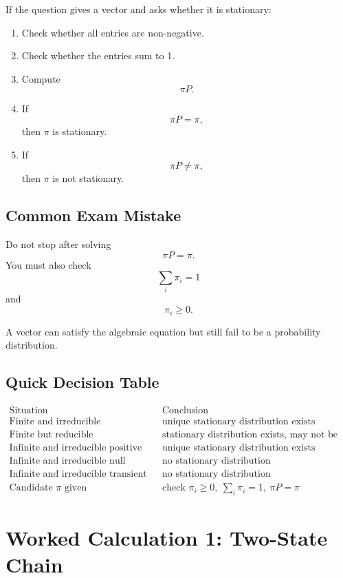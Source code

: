 \documentclass[12pt,a4paper]{article}
\theoremstyle{notestyle}
\begin{document}
If the question gives a vector and asks whether it is stationary:

\begin{enumerate}[leftmargin=1.2cm]
    \item Check whether all entries are non-negative.
    \item Check whether the entries sum to 1.
    \item Compute
    \[
    \pi P.
    \]
    \item If
    \[
    \pi P=\pi,
    \]
    then $\pi$ is stationary.
    \item If
    \[
    \pi P\neq \pi,
    \]
    then $\pi$ is not stationary.
\end{enumerate}

\subsection*{Common Exam Mistake}

Do not stop after solving
\[
\pi P=\pi.
\]
You must also check
\[
\sum_i\pi_i=1
\]
and
\[
\pi_i\geq 0.
\]

A vector can satisfy the algebraic equation but still fail to be a probability distribution.

\subsection*{Quick Decision Table}

\[
\begin{array}{c|c}
\text{Situation} & \text{Conclusion}\\
\hline
\text{Finite and irreducible} & \text{unique stationary distribution exists}\\
\text{Finite but reducible} & \text{stationary distribution exists, may not be unique}\\
\text{Infinite and irreducible positive recurrent} & \text{unique stationary distribution exists}\\
\text{Infinite and irreducible null recurrent} & \text{no stationary distribution}\\
\text{Infinite and irreducible transient} & \text{no stationary distribution}\\
\text{Candidate }\pi\text{ given} & \text{check }\pi_i\geq0,\ \sum_i\pi_i=1,\ \pi P=\pi
\end{array}
\]

\section{Worked Calculation 1: Two-State Chain}
\end{document}
